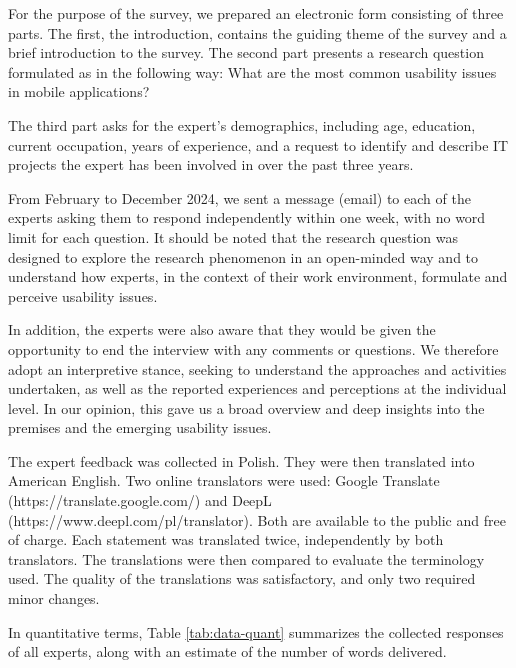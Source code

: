 \documentclass[preprint,12pt,number]{elsarticle}
\begin{document}
For the purpose of the survey, we prepared an electronic form consisting of three parts. The first, the introduction, contains the guiding theme of the survey and a brief introduction to the survey. The second part presents a research question formulated as in the following way: What are the most common usability issues in mobile applications?
  
The third part asks for the expert's demographics, including age, education, current occupation, years of experience, and a request to identify and describe IT projects the expert has been involved in over the past three years. 

From February to December 2024, we sent a message (email) to each of the experts asking them to respond independently within one week, with no word limit for each question. It should be noted that the research question was designed to explore the research phenomenon in an open-minded way and to understand how experts, in the context of their work environment, formulate and perceive usability issues. 

In addition, the experts were also aware that they would be given the opportunity to end the interview with any comments or questions. We therefore adopt an interpretive stance, seeking to understand the approaches and activities undertaken, as well as the reported experiences and perceptions at the individual level. In our opinion, this gave us a broad overview and deep insights into the premises and the emerging usability issues.

The expert feedback was collected in Polish. They were then translated into American English. Two online translators were used: Google Translate (https://translate.google.com/) and DeepL (https://www.deepl.com/pl/translator). Both are available to the public and free of charge. Each statement was translated twice, independently by both translators. The translations were then compared to evaluate the terminology used. The quality of the translations was satisfactory, and only two required minor changes.

In quantitative terms, Table \ref{tab:data-quant} summarizes the collected responses of all experts, along with an estimate of the number of words delivered.
\end{document}
